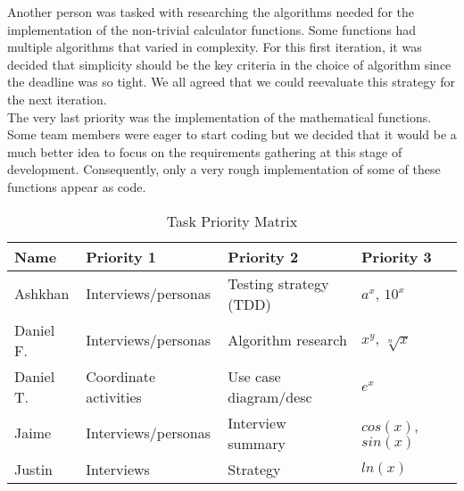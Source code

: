 \documentclass{article}
\begin{document}
Another person was tasked with researching the algorithms needed for the implementation of the non-trivial calculator functions. Some functions had multiple algorithms that varied in complexity. For this first iteration, it was decided that simplicity should be the key criteria in the choice of algorithm since the deadline was so tight. We all agreed that we could reevaluate this strategy for the next iteration. \\

The very last priority was the implementation of the mathematical functions. Some team members were eager to start coding but we decided that it would be a much better idea to focus on the requirements gathering at this stage of development. Consequently, only a very rough implementation of some of these functions appear as code. \\

\begin{table}[ht]
\centering
\caption{Task Priority Matrix}
\begin{tabular}{|l|l|l|l|}
\hline
\textbf{Name}&\textbf{Priority 1}  &\textbf{Priority 2}  &\textbf{Priority 3}  \\ \hline
 Ashkhan&Interviews/personas  &Testing strategy (TDD)  &$a^x$, $10^x$  \\ \hline
 Daniel F.&Interviews/personas  &Algorithm research  &$x^y$, $\sqrt[n]{x}$  \\ \hline
 Daniel T.&Coordinate activities  &Use case diagram/desc  &$e^x$  \\ \hline
 Jaime&Interviews/personas  &Interview summary  &$cos(x)$, $sin(x)$  \\ \hline
 Justin&Interviews  &Strategy  &$ln(x)$  \\ \hline
\end{tabular}
\end{table}
\end{document}
